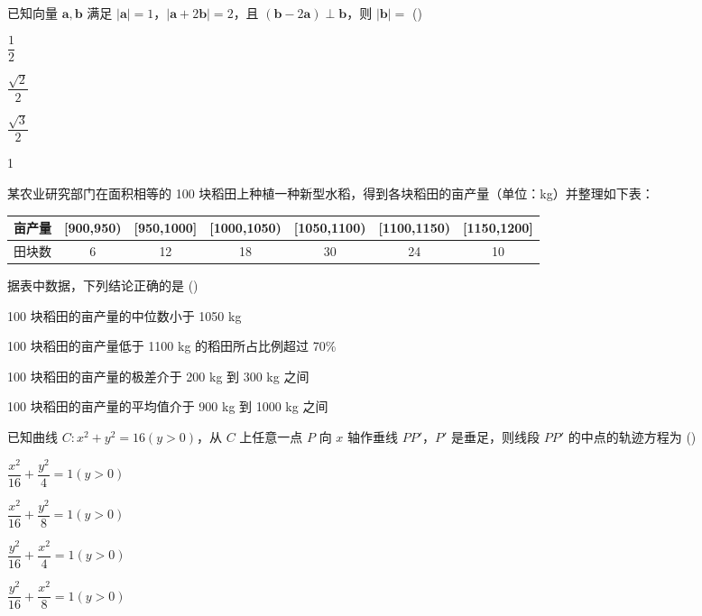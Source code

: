 \documentclass{exam-zh}
\begin{document}
\begin{question}
已知向量 $\mathbf{a}, \mathbf{b}$ 满足 $|\mathbf{a}|=1$，$|\mathbf{a}+2\mathbf{b}|=2$，且 $(\mathbf{b}-2\mathbf{a})\perp\mathbf{b}$，则 $|\mathbf{b}|=$
(\hspace{1cm})
\begin{choices}
\item $\dfrac{1}{2}$
\item $\dfrac{\sqrt{2}}{2}$
\item $\dfrac{\sqrt{3}}{2}$
\item 1
\end{choices}
\end{question}

\begin{question}
某农业研究部门在面积相等的 100 块稻田上种植一种新型水稻，得到各块稻田的亩产量（单位：kg）并整理如下表：
\begin{center}
\begin{tabular}{|l|c|c|c|c|c|c|}
\hline
亩产量 & [900,950) & [950,1000] & [1000,1050) & [1050,1100) & [1100,1150) & [1150,1200] \\
\hline
田块数 & 6 & 12 & 18 & 30 & 24 & 10 \\
\hline
\end{tabular}
\end{center}
据表中数据，下列结论正确的是
(\hspace{1cm})
\begin{choices}
\item 100 块稻田的亩产量的中位数小于 1050 kg
\item 100 块稻田的亩产量低于 1100 kg 的稻田所占比例超过 70\%
\item 100 块稻田的亩产量的极差介于 200 kg 到 300 kg 之间
\item 100 块稻田的亩产量的平均值介于 900 kg 到 1000 kg 之间
\end{choices}
\end{question}

\begin{question}
已知曲线 $C: x^2+y^2=16(y>0)$，从 $C$ 上任意一点 $P$ 向 $x$ 轴作垂线 $PP'$，$P'$ 是垂足，则线段 $PP'$ 的中点的轨迹方程为
(\hspace{1cm})
\begin{choices}
\item $\dfrac{x^2}{16}+\dfrac{y^2}{4}=1(y>0)$
\item $\dfrac{x^2}{16}+\dfrac{y^2}{8}=1(y>0)$
\item $\dfrac{y^2}{16}+\dfrac{x^2}{4}=1(y>0)$
\item $\dfrac{y^2}{16}+\dfrac{x^2}{8}=1(y>0)$
\end{choices}
\end{question}
\end{document}
